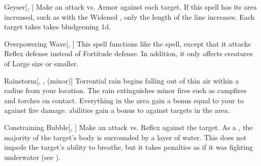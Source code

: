 \lowercase{\hypertarget{spell:Geyser}{}}\label{spell:Geyser}
\begin{freeability}[Rank 3]{\hypertarget{spell:Geyser}{Geyser}}[, ]
Make an attack vs. Armor against each target.
If this spell has its area increased, such as with the Widened , only the length of the line increases.
\hit Each target takes takes bludgeoning  \plus1d.
\end{freeability}
\vspace{0.25em}



\lowercase{\hypertarget{spell:Overpowering Wave}{}}\label{spell:Overpowering Wave}
\begin{freeability}[Rank 3]{\hypertarget{spell:Overpowering Wave}{Overpowering Wave}}[, ]
This spell functions like the  spell, except that it attacks Reflex defense instead of Fortitude defense.
In addition, it only affects creatures of Large size or smaller.
\end{freeability}
\vspace{0.25em}



\lowercase{\hypertarget{spell:Rainstorm}{}}\label{spell:Rainstorm}
\begin{freeability}[Rank 3]{\hypertarget{spell:Rainstorm}{Rainstorm}}[, ,  (minor)]
Torrential rain begins falling out of thin air within a \arealarge radius  from your location.
The rain extinguishes minor fires such as campfires and torches on contact.
Everything in the area gain a bonus equal to your  to  against fire damage.
 abilities gain a  bonus to  against targets in the area.
\end{freeability}
\vspace{0.25em}



\lowercase{\hypertarget{spell:Constraining Bubble}{}}\label{spell:Constraining Bubble}
\begin{freeability}[Rank 4]{\hypertarget{spell:Constraining Bubble}{Constraining Bubble}}[, ]
Make an attack vs. Reflex against the target.
\hit As a , the majority of the target's body is surrounded by a layer of water.
This does not impede the target's ability to breathe, but it takes penalties as if it was fighting underwater (see ).
\end{freeability}
\vspace{0.25em}



